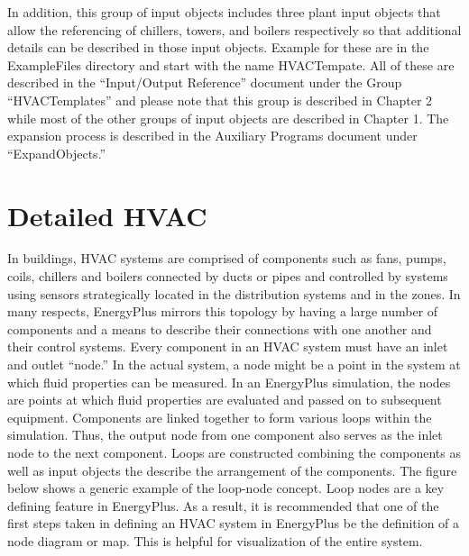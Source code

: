 In addition, this group of input objects includes three plant input
objects that allow the referencing of chillers, towers, and boilers
respectively so that additional details can be described in those
input objects. Example for these are in the ExampleFiles directory
and start with the name HVACTempate. All of these are described in
the \textquotedblleft Input/Output Reference\textquotedblright{} document
under the Group \textquotedblleft HVACTemplates\textquotedblright{}
and please note that this group is described in Chapter 2 while most
of the other groups of input objects are described in Chapter 1. The
expansion process is described in the Auxiliary Programs document
under \textquotedblleft ExpandObjects.\textquotedblright{}

\section{Detailed HVAC}

In buildings, HVAC systems are comprised of components such as fans,
pumps, coils, chillers and boilers connected by ducts or pipes and
controlled by systems using sensors strategically located in the distribution
systems and in the zones. In many respects, EnergyPlus mirrors this
topology by having a large number of components and a means to describe
their connections with one another and their control systems. Every
component in an HVAC system must have an inlet and outlet \textquotedblleft node.\textquotedblright{}
In the actual system, a node might be a point in the system at which
fluid properties can be measured. In an EnergyPlus simulation, the
nodes are points at which fluid properties are evaluated and passed
on to subsequent equipment. Components are linked together to form
various loops within the simulation. Thus, the output node from one
component also serves as the inlet node to the next component. Loops
are constructed combining the components as well as input objects
the describe the arrangement of the components. The figure below shows
a generic example of the loop-node concept. Loop nodes are a key defining
feature in EnergyPlus. As a result, it is recommended that one of
the first steps taken in defining an HVAC system in EnergyPlus be
the definition of a node diagram or map. This is helpful for visualization
of the entire system. 

